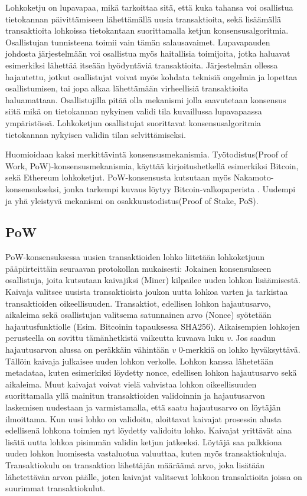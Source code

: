 Lohkoketju on lupavapaa, mikä tarkoittaa sitä, että kuka tahansa voi osallistua tietokannan päivittämiseen lähettämällä uusia transaktioita, sekä lisäämällä transaktioita lohkoissa tietokantaan suorittamalla ketjun konsensusalgoritmia. Osallistujan tunnisteena toimii vain tämän salausavaimet. Lupavapauden johdosta järjestelmään voi osallistua myös haitallisia toimijoita, jotka haluavat esimerkiksi lähettää itseään hyödyntäviä transaktioita. Järjestelmän ollessa hajautettu, jotkut osallistujat voivat myös kohdata teknisiä ongelmia ja lopettaa osallistumisen, tai jopa alkaa lähettämään virheellisiä transaktioita haluamattaan. Osallistujilla pitää olla mekanismi jolla saavutetaan konsensus siitä mikä on tietokannan nykyinen validi tila kuvaillussa lupavapaassa ympäristössä. Lohkoketjun osallistujat suorittavat konsensusalgoritmia tietokannan nykyisen validin tilan selvittämiseksi. 

Huomioidaan kaksi merkittävintä konsensusmekanismia. Työtodistus(Proof of Work, PoW)-konsensusmekanismia, käyttää kirjoitushetkellä esimerkiksi Bitcoin, sekä Ethereum lohkoketjut. PoW-konsensusta kutsutaan myös Nakamoto-konsensukseksi, jonka tarkempi kuvaus löytyy Bitcoin-valkopaperista \cite{Nakamoto_bitcoin}. Uudempi ja yhä yleistyvä mekanismi on  osakkuustodistus(Proof of Stake, PoS). 

\subsection{PoW}
PoW-konsensuksessa uusien transaktioiden lohko liitetään lohkoketjuun pääpiirteittäin seuraavan protokollan mukaisesti: Jokainen konsensukseen osallistuja, joita kutsutaan kaivajiksi (Miner) kilpailee uuden lohkon lisäämisestä. Kaivaja valitsee uusista transaktioista joukon uutta lohkoa varten ja tarkistaa transaktioiden oikeellisuuden. Transaktiot, edellisen lohkon hajautusarvo, aikaleima sekä osallistujan valitsema satunnainen arvo (Nonce) syötetään hajautusfunktiolle (Esim. Bitcoinin tapauksessa SHA256). Aikaisempien lohkojen perusteella on sovittu tämänhetkistä vaikeutta kuvaava luku $v$. Jos saadun hajautusarvon alussa on peräkkäin vähintään $v$ 0-merkkiä on lohko hyväksyttävä. Tällöin kaivaja julkaisee uuden lohkon verkolle. Lohkon kanssa lähetetään metadataa, kuten esimerkiksi löydetty nonce, edellisen lohkon hajautusarvo sekä aikaleima. Muut kaivajat voivat vielä vahvistaa lohkon oikeellisuuden suorittamalla yllä mainitun transaktioiden validoinnin ja hajautusarvon laskemisen uudestaan ja varmistamalla, että saatu hajautusarvo on löytäjän ilmoittama. Kun uusi lohko on validoitu, aloittavat kaivajat prosessin alusta edellisenä lohkona toimien nyt löydetty validoitu lohko. Kaivajat yrittävät aina lisätä uutta lohkoa pisimmän validin ketjun jatkeeksi. Löytäjä saa palkkiona uuden lohkon luomisesta vastaluotua valuuttaa, kuten myös transaktiokuluja. Transaktiokulu on transaktion lähettäjän määräämä arvo, joka lisätään lähetettävän arvon päälle, joten kaivajat valitsevat lohkoon transaktioita joissa on suurimmat transaktiokulut.

